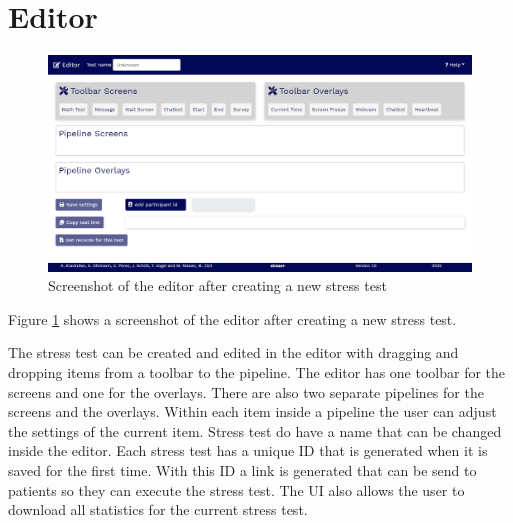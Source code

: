 \section{Editor}
\label{sec:editor}

\begin{figure}[htb]
    \centering
    \includegraphics[width=\textwidth]{figures/screenshot-editor.png}
    \caption{Screenshot of the editor after creating a new stress test}
    \label{fig:screenshot-editor}
\end{figure}

Figure \ref{fig:screenshot-editor} shows a screenshot of the editor after creating a new stress test.

The stress test can be created and edited in the editor with dragging and dropping items from a toolbar to the pipeline.
The editor has one toolbar for the screens and one for the overlays. 
There are also two separate pipelines for the screens and the overlays. 
Within each item inside a pipeline the user can adjust the settings of the current item. 
Stress test do have a name that can be changed inside the editor.
Each stress test has a unique ID that is generated when it is saved for the first time.
With this ID a link is generated that can be send to patients so they can execute the stress test.
The UI also allows the user to download all statistics for the current stress test.
